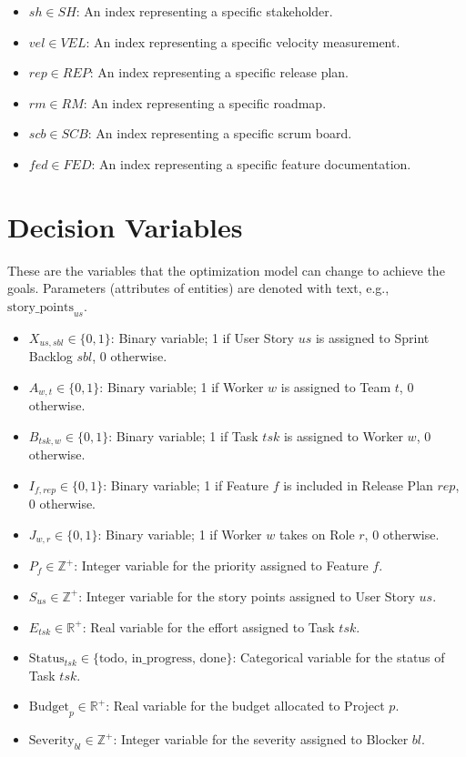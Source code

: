 \documentclass{article}
\begin{document}
\begin{itemize}
    \item $sh \in SH$: An index representing a specific stakeholder.
    \item $vel \in VEL$: An index representing a specific velocity measurement.
    \item $rep \in REP$: An index representing a specific release plan.
    \item $rm \in RM$: An index representing a specific roadmap.
    \item $scb \in SCB$: An index representing a specific scrum board.
    \item $fed \in FED$: An index representing a specific feature documentation.
\end{itemize}

\section{Decision Variables}
\label{sec:decisionvariables}
These are the variables that the optimization model can change to achieve the goals. Parameters (attributes of entities) are denoted with text, e.g., $\text{story\_points}_{us}$.
\begin{itemize}
    \item $X_{us, sbl} \in \{0, 1\}$: Binary variable; 1 if User Story $us$ is assigned to Sprint Backlog $sbl$, 0 otherwise.
    \item $A_{w, t} \in \{0, 1\}$: Binary variable; 1 if Worker $w$ is assigned to Team $t$, 0 otherwise.
    \item $B_{tsk, w} \in \{0, 1\}$: Binary variable; 1 if Task $tsk$ is assigned to Worker $w$, 0 otherwise.
    \item $I_{f, rep} \in \{0, 1\}$: Binary variable; 1 if Feature $f$ is included in Release Plan $rep$, 0 otherwise.
    \item $J_{w, r} \in \{0, 1\}$: Binary variable; 1 if Worker $w$ takes on Role $r$, 0 otherwise.
    \item $P_f \in \mathbb{Z}^+$: Integer variable for the priority assigned to Feature $f$.
    \item $S_{us} \in \mathbb{Z}^+$: Integer variable for the story points assigned to User Story $us$.
    \item $E_{tsk} \in \mathbb{R}^+$: Real variable for the effort assigned to Task $tsk$.
    \item $\text{Status}_{tsk} \in \{\text{todo, in\_progress, done}\}$: Categorical variable for the status of Task $tsk$.
    \item $\text{Budget}_p \in \mathbb{R}^+$: Real variable for the budget allocated to Project $p$.
    \item $\text{Severity}_{bl} \in \mathbb{Z}^+$: Integer variable for the severity assigned to Blocker $bl$.
\end{itemize}
\end{document}
